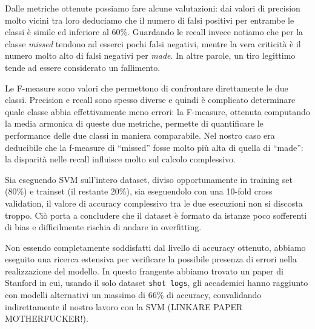 \par
Dalle metriche ottenute possiamo fare alcune valutazioni: dai valori di precision molto vicini tra loro deduciamo che il numero di falsi positivi per entrambe le classi è simile ed inferiore al 60\%.
Guardando le recall invece notiamo che per la classe \textit{missed} tendono ad esserci pochi falsi negativi, mentre la vera criticità è il numero molto alto di falsi negativi per \textit{made}. In altre parole, un tiro legittimo tende ad essere considerato un fallimento.

Le F-measure sono valori che permettono di confrontare direttamente le due classi. Precision e recall sono spesso diverse e quindi è complicato determinare quale classe abbia effettivamente meno errori: la F-measure, ottenuta computando la media armonica di queste due metriche, permette di quantificare le performance delle due classi in maniera comparabile. Nel nostro caso era deducibile che la f-measure di “missed” fosse molto più alta di quella di “made”: la disparità nelle recall influisce molto sul calcolo complessivo.

\par
Sia eseguendo SVM sull'intero dataset, diviso opportunamente in training set (80\%) e trainset (il restante 20\%), sia eseguendolo con una 10-fold cross validation, il valore di accuracy complessivo tra le due esecuzioni non si discosta troppo. Ciò porta a concludere che il dataset è formato da istanze poco sofferenti di bias e difficilmente rischia di andare in overfitting.

\par
Non essendo completamente soddisfatti dal livello di accuracy ottenuto, abbiamo eseguito una ricerca estensiva per verificare la possibile presenza di errori nella realizzazione del modello. In questo frangente abbiamo trovato un paper di Stanford in cui, usando il solo dataset \texttt{shot logs}, gli accademici hanno raggiunto con modelli alternativi un massimo di 66\% di accuracy, convalidando indirettamente il nostro lavoro con la SVM (LINKARE PAPER MOTHERFUCKER!).
